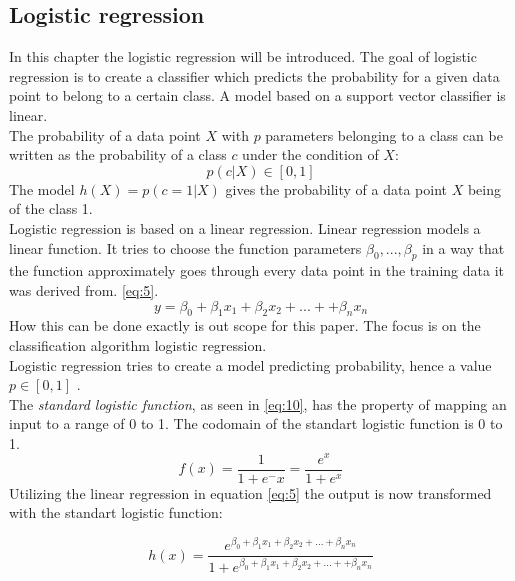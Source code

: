 
\subsection{Logistic regression}
In this chapter the logistic regression will be introduced. The goal of logistic regression is to create a classifier which predicts the probability for a given data point  to belong to a certain class. A model based on a support vector classifier is linear.
\\

The probability of a data point $X$ with $p$ parameters belonging to a class can be written as the probability of a class $c$ under the condition of $X$:
\begin{equation} \label{eq:4}
p(c|X) \in [0,1]
\end{equation}
The model $h(X)=p(c=1|X)$ gives the probability of a data point $X$ being of the class 1.
\\

Logistic regression is based on a linear regression. Linear regression models a linear function. It tries to choose the function parameters $\beta_0, ..., \beta_p$ in a way  that the function approximately goes through every data point in the training data it was derived from. \ref{eq:5}. 
\begin{equation} \label{eq:5}
y=\beta_0 + \beta_1 x_1 + \beta_2 x_2 + ... + + \beta_n x_n
\end{equation}
How this can be done exactly is out scope for this paper. The focus is on the classification algorithm logistic regression.\\
Logistic regression tries to create a model predicting probability, hence a value $p \in [0,1]$ . \\
The \emph{standard logistic function}, as seen in \ref{eq:10}, has the property of mapping an input to a range of 0 to 1. The codomain of the standart logistic function is 0 to 1.
\begin{equation} \label{eq:10}
f(x)=\frac{1}{1+e^-x}=\frac{e^x}{1+e^x}
\end{equation}
Utilizing the linear regression in equation \ref{eq:5} the output is now transformed with the standart logistic function:

\begin{equation} \label{eq:11}
h(x)=\frac{e^{\beta_0 + \beta_1 x_1 + \beta_2 x_2 + ... + \beta_n x_n}}{1+e^{\beta_0 + \beta_1 x_1 + \beta_2 x_2 + ... + + \beta_n x_n}}
\end{equation}

